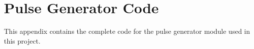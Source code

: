 \chapter{Pulse Generator Code} \label{App:PulseGeneratorCode}

This appendix contains the complete code for the pulse generator module used in this project.

